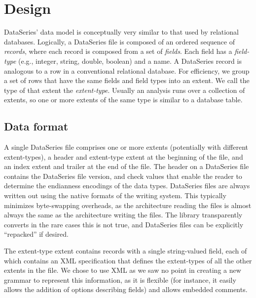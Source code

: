 \documentclass{acm_proc_article-sp}
\begin{document}
\section{Design}\label{sec:design}

DataSeries' data model is conceptually very similar to that used by
relational databases.  Logically, a DataSeries file is composed of an
ordered sequence of {\it records}, where each record is composed from
a set of {\it fields}. Each field has a {\it field-type} (e.g.,
integer, string, double, boolean) and a name. A DataSeries record is
analogous to a row in a conventional relational database. For
efficiency, we group a set of rows that have the same fields and field
types into an extent.  We call the type of that extent the {\it
extent-type}.  Usually an analysis 
runs over a collection of
extents, so one or more extents of the same type is similar to a
database table.

\subsection{Data format}

A single DataSeries file comprises one or more extents
(potentially with different extent-types), a header and
extent-type extent at the beginning of the file, and an index extent
and trailer at the end of the file. The header on a DataSeries file 
contains the DataSeries
file version, and check values that enable the reader to determine the
endianness encodings of the data types.  DataSeries files are always
written out using the native formats of the writing system. This 
typically minimizes byte-swapping overheads, as the architecture 
reading the files is almost always the same as the architecture writing
the files. The library transparently converts in the rare cases this
is not true, and DataSeries files can be explicitly ``repacked'' if desired. 

The extent-type extent contains records with a single string-valued
field, each of which contains an XML specification that defines the
extent-types of all the other extents in the file. We chose to use XML
as we saw no point in creating a new
grammar 
to represent this information, as it is flexible (for
instance, it easily allows the addition of options describing
fields) and allows embedded comments.
\end{document}
